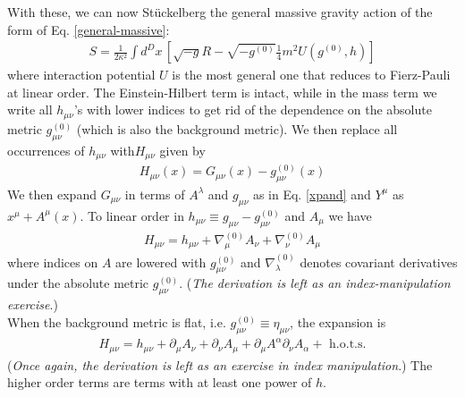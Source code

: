\documentclass{book}
\theoremstyle{definition}
\newcommand{\p}{\partial}
\newcommand{\al}{\alpha}
\newcommand{\f}[2]{\frac{#1}{#2}}
\newcommand{\lb}{\left[}
\newcommand{\rb}{\right]}
\begin{document}
With these, we can now St\"{u}ckelberg the general massive gravity action of the form of Eq. \eqref{general-massive}:
\begin{align}
\boxed{S = \f{1}{2\kappa^2}\int d^Dx\, \lb \sqrt{-g}R - \sqrt{-g^{(0)}}\f{1}{4}m^2 U(g^{(0)},h) \rb}
\end{align}
where interaction potential $U$ is the most general one that reduces to Fierz-Pauli at linear order. The Einstein-Hilbert term is intact, while in the mass term we write all $h_{\mu\nu}$'s with lower indices to get rid of the dependence on the absolute metric $g^{(0)}_{\mu\nu}$ (which is also the background metric). We then replace all occurrences of $h_{\mu\nu}$ with$H_{\mu\nu}$ given by
\begin{align}
\boxed{H_{\mu\nu}(x) = G_{\mu\nu}(x) - g^{(0)}_{\mu\nu}(x)}
\end{align}
We then expand $G_{\mu\nu}$ in terms of $A^\lambda$ and $g_{\mu\nu}$ as in Eq. \eqref{xpand} and $Y^\mu$ as $x^\mu + A^\mu(x)$. To linear order in $h_{\mu\nu} \equiv g_{\mu\nu} - g^{(0)}_{\mu\nu}$ and $A_\mu$ we have
\begin{align}
\boxed{H_{\mu\nu} = h_{\mu\nu} + \nabla_\mu^{(0)}A_\nu + \nabla^{(0)}_\nu A_\mu}
\end{align}
where indices on $A$ are lowered with $g^{(0)}_{\mu\nu}$ and $\nabla^{(0)}_\lambda$ denotes covariant derivatives under the absolute metric $g_{\mu\nu}^{(0)}$. (\textit{The derivation is left as an index-manipulation exercise}.)\\

When the background metric is flat, i.e. $g^{(0)}_{\mu\nu} \equiv \eta_{\mu\nu}$, the expansion is
\begin{align}\label{H}
\boxed{H_{\mu\nu} = h_{\mu\nu} + \p_\mu A_\nu + \p_\nu A_\mu + \p_\mu A^\al \p_\nu A_\al + \text{ h.o.t.s.}}
\end{align}
(\textit{Once again, the derivation is left as an exercise in index manipulation}.) The higher order terms are terms with at least one power of $h$. \\
\end{document}
